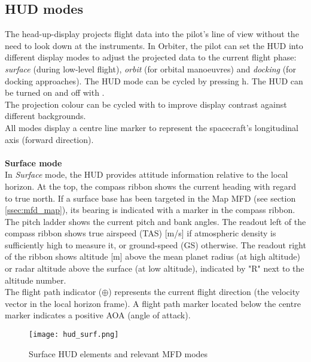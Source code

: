 \documentclass[Orbiter User Manual.tex]{subfiles}
\begin{document}
\subsection{HUD modes}
\label{ssec:hud_modes}
The head-up-display projects flight data into the pilot's line of view without the need to look down at the instruments. In Orbiter, the pilot can set the HUD into different display modes to adjust the projected data to the current flight phase: \textit{surface} (during low-level flight), \textit{orbit} (for orbital manoeuvres) and \textit{docking} (for docking approaches). The HUD mode can be cycled by pressing h. The HUD can be turned on and off with \Ctrl{}.\\
The projection colour can be cycled with \Alt{} to improve display contrast against different backgrounds.\\
All modes display a centre line marker to represent the spacecraft's longitudinal axis (forward direction).\\
\\
\textbf{Surface mode}\\
In \textit{Surface} mode, the HUD provides attitude information relative to the local horizon. At the top, the compass ribbon shows the current heading with regard to true north. If a surface base has been targeted in the Map MFD (see section \ref{ssec:mfd_map}), its bearing is indicated with a marker in the compass ribbon. The pitch ladder shows the current pitch and bank angles. The readout left of the compass ribbon shows true airspeed (TAS) [m/s] if atmospheric density is sufficiently high to measure it, or ground-speed (GS) otherwise. The readout right of the ribbon shows altitude [m] above the mean planet radius (at high altitude) or radar altitude above the surface (at low altitude), indicated by "R" next to the altitude number.\\
The flight path indicator ($\oplus$) represents the current flight direction (the velocity vector in the local horizon frame). A flight path marker located below the centre marker indicates a positive AOA (angle of attack).

\begin{figure}[H]
  \centering
  \texttt{[image: hud\_surf.png]}
  \caption{Surface HUD elements and relevant MFD modes}
\end{figure}
\end{document}
